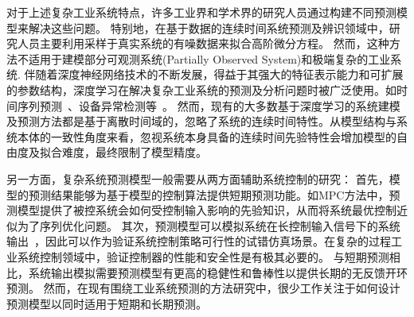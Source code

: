 对于上述复杂工业系统特点，许多工业界和学术界的研究人员通过构建不同预测模型来解决这些问题。
特别地，在基于数据的连续时间系统预测及辨识领域中，研究人员主要利用采样于真实系统的有噪数据来拟合高阶微分方程。
然而，这种方法不适用于建模部分可观测系统(Partially Observed System)和极端复杂的工业系统.
伴随着深度神经网络技术的不断发展，得益于其强大的特征表示能力和可扩展的参数结构，深度学习在解决复杂工业系统的预测及分析问题时被广泛使用。如时间序列预测~\cite{Member2019,Essien2020,9161367,9522017,neu2021systematic}、设备异常检测等~\cite{9326384}。
然而，现有的大多数基于深度学习的系统建模及预测方法都是基于离散时间域的，忽略了系统的连续时间特性。从模型结构与系统本体的一致性角度来看，忽视系统本身具备的连续时间先验特性会增加模型的自由度及拟合难度，最终限制了模型精度。

另一方面，复杂系统预测模型一般需要从两方面辅助系统控制的研究：
首先，模型的预测结果能够为基于模型的控制算法提供短期预测功能。如MPC方法中，预测模型提供了被控系统会如何受控制输入影响的先验知识，从而将系统最优控制近似为了序列优化问题。
其次，预测模型可以模拟系统在长控制输入信号下的系统输出~\cite{Demeester2020SystemIW}，因此可以作为验证系统控制策略可行性的试错仿真场景。在复杂的过程工业系统控制领域中，验证控制器的性能和安全性是有极其必要的。
与短期预测相比，系统输出模拟需要预测模型有更高的稳健性和鲁棒性以提供长期的无反馈开环预测。
然而，在现有围绕工业系统预测的方法研究中，很少工作关注于如何设计预测模型以同时适用于短期和长期预测。


